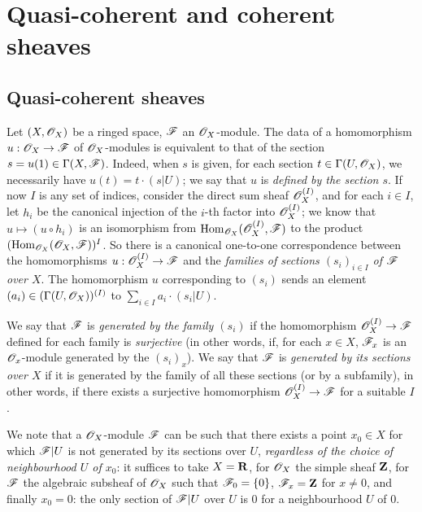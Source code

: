 \section{Quasi-coherent and coherent sheaves}
\label{section:0.5}

\subsection{Quasi-coherent sheaves}
\label{subsection:0.5.1}

\begin{env}[5.1.1]
\label{0.5.1.1}
Let $(X,\mathscr{O}_X)$ be a ringed space, $\mathscr{F}$ an $\mathscr{O}_X$-module.
The data of a homomorphism $u:\sh{O}_X\to\sh{F}$ of $\mathscr{O}_X$-modules is equivalent to that of the section $s=u(1)\in\Gamma(X,\mathscr{F})$.
Indeed, when $s$ is given, for each section $t\in\Gamma(U,\mathscr{O}_X)$, we necessarily have $u(t)=t\cdot(s|U)$;
we say that $u$ is \emph{defined by the section $s$}.
If now $I$ is any set of indices, consider the direct sum sheaf $\mathscr{O}_X^{(I)}$, and for each $i\in I$, let $h_i$ be the canonical injection of the $i$-th factor into $\mathscr{O}_X^{(I)}$;
we know that $u\mapsto(u\circ h_i)$ is an isomorphism from $\operatorname{Hom}_{\mathscr{O}_X}(\mathscr{O}_X^{(I)},\mathscr{F})$ to the product $(\operatorname{Hom}_{\mathscr{O}_X}(\mathscr{O}_X,\mathscr{F}))^I$.
So there is a canonical one-to-one correspondence between the homomorphisms $u:\sh{O}_X^{(I)}\to\sh{F}$ and the \emph{families of sections $(s_i)_{i\in I}$ of $\mathscr{F}$ over $X$}.
The homomorphism $u$ corresponding to $(s_i)$ sends an element $(a_i)\in(\Gamma(U,\mathscr{O}_X))^{(I)}$ to $\sum_{i\in I}a_i\cdot(s_i|U)$.

We say that $\mathscr{F}$ is \emph{generated by the family $(s_i)$} if the homomorphism $\sh{O}_X^{(I)}\to\sh{F}$ defined
for each family is \emph{surjective} (in other words, if, for each $x\in X$, $\mathscr{F}_x$ is an $\mathscr{O}_x$-module generated by the $(s_i)_x$).
We say that $\mathscr{F}$ is \emph{generated by its sections over $X$} if it is generated by the family of all these sections (or by a subfamily), in other words, if there exists a surjective homomorphism $\sh{O}_X^{(I)}\to\sh{F}$ for a suitable $I$.

We note that a $\mathscr{O}_X$-module $\mathscr{F}$ can be such that there exists a point $x_0\in X$ for which $\mathscr{F}|U$ is not generated by its sections over $U$, \emph{regardless of the choice of neighbourhood $U$ of $x_0$}:
it suffices to take $X=\mathbf{R}$, for $\mathscr{O}_X$ the simple sheaf $\mathbf{Z}$, for $\mathscr{F}$ the algebraic subsheaf of $\mathscr{O}_X$ such that $\mathscr{F}_0=\{0\}$, $\mathscr{F}_x=\mathbf{Z}$ for $x\neq 0$, and finally $x_0=0$:
the only section of $\mathscr{F}|U$ over $U$ is $0$ for a neighbourhood $U$ of $0$.
\end{env}

